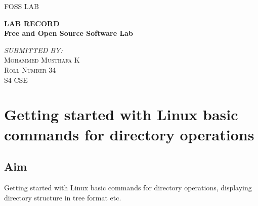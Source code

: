 \documentclass{article}
\newenvironment{bottompar}{\par\vspace*{\fill}}{\clearpage}
\begin{document}
\newcommand{\HRule}{\rule{\linewidth}{0.5mm}} 
\begin{titlepage}

\center

\textsc{\LARGE FOSS LAB }\\[1.0 cm]
\begin{bottompar}
{ \huge \bfseries LAB RECORD}\\[0.4cm] 
{ \large \bfseries Free and Open Source Software Lab}\\[0.4cm] 
\end{bottompar}


\begin{bottompar}
\emph{\small SUBMITTED BY:}\\
\textsc{\Large Mohammed Musthafa K \\
 Roll Number 34 \\
 S4 CSE\\
 } 
 \end{bottompar}




\vfill



\end{titlepage}
\newpage
\tableofcontents{}

\newpage
\section{Getting started with Linux basic commands for directory operations}

\subsection{Aim}
Getting started with Linux basic commands for directory operations, displaying directory structure in tree format etc.
\end{document}
